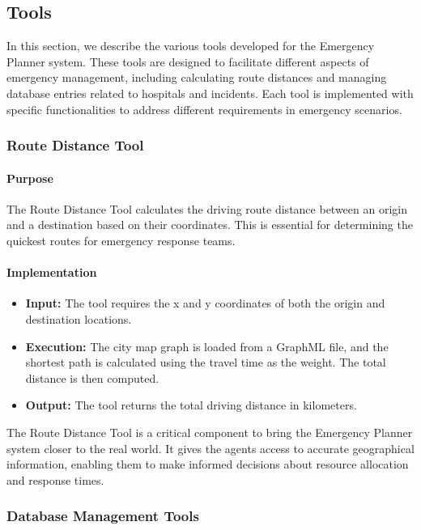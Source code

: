 \subsection{Tools}\label{sec:tools}

In this section, we describe the various tools developed for the Emergency Planner system. These tools are designed to facilitate different aspects of emergency management, including calculating route distances and managing database entries related to hospitals and incidents. Each tool is implemented with specific functionalities to address different requirements in emergency scenarios.

\subsubsection{Route Distance Tool}

\paragraph{Purpose}
The Route Distance Tool calculates the driving route distance between an origin and a destination based on their coordinates. This is essential for determining the quickest routes for emergency response teams.

\paragraph{Implementation}
\begin{itemize}
    \item \textbf{Input:} The tool requires the x and y coordinates of both the origin and destination locations.
    \item \textbf{Execution:} The city map graph is loaded from a GraphML file, and the shortest path is calculated using the travel time as the weight. The total distance is then computed.
    \item \textbf{Output:} The tool returns the total driving distance in kilometers.
\end{itemize}

The Route Distance Tool is a critical component to bring the Emergency Planner system closer to the real world. It gives the agents access to accurate geographical information, enabling them to make informed decisions about resource allocation and response times.

\subsubsection{Database Management Tools}

